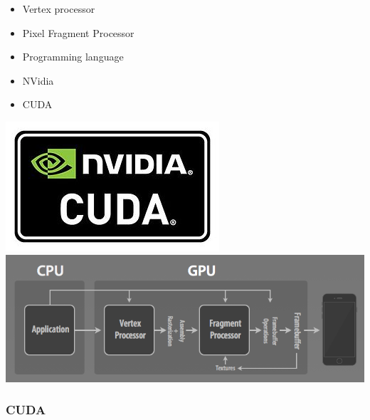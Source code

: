 \documentclass{beamer}
\begin{document}
\begin{frame}
\begin{itemize}
	\item {Vertex processor}
	\item {Pixel Fragment Processor}
\end{itemize}
\begin{itemize}
	\item Programming language
	\item NVidia 
	\item CUDA
\end{itemize}
\includegraphics[scale=0.3]{cuda}
\includegraphics[scale=0.3]{vertex}
\end{frame}

\begin{frame}
\frametitle{CUDA}
\end{frame}
\end{document}
